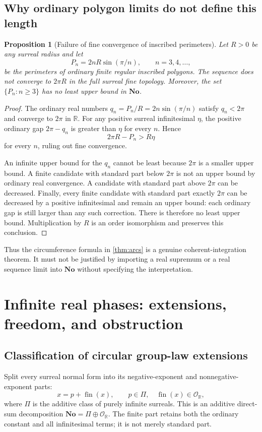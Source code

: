 \documentclass[11pt]{article}
\numberwithin{equation}{section}
\newtheorem{proposition}[theorem]{Proposition}
\theoremstyle{definition}
\newcommand{\No}{\mathbf{No}}
\newcommand{\R}{\mathbb R}
\newcommand{\OO}{\mathcal O}
\newcommand{\fin}{\operatorname{fin}}
\begin{document}
\subsection{Why ordinary polygon limits do not define this length}
\begin{proposition}[Failure of fine convergence of inscribed perimeters]\label{prop:perimeters}
Let $R>0$ be any surreal radius and let
\[
 P_n=2nR\sin(\pi/n),\qquad n=3,4,\ldots,
\]
be the perimeters of ordinary finite regular inscribed polygons. The sequence does not converge to $2\pi R$ in the full surreal fine topology. Moreover, the set $\{P_n:n\ge3\}$ has no least upper bound in $\No$.
\end{proposition}
\begin{proof}
The ordinary real numbers $q_n=P_n/R=2n\sin(\pi/n)$ satisfy $q_n<2\pi$ and converge to $2\pi$ in $\R$. For any positive surreal infinitesimal $\eta$, the positive ordinary gap $2\pi-q_n$ is greater than $\eta$ for every $n$. Hence
\[
 2\pi R-P_n>R\eta
\]
for every $n$, ruling out fine convergence.

An infinite upper bound for the $q_n$ cannot be least because $2\pi$ is a smaller upper bound. A finite candidate with standard part below $2\pi$ is not an upper bound by ordinary real convergence. A candidate with standard part above $2\pi$ can be decreased. Finally, every finite candidate with standard part exactly $2\pi$ can be decreased by a positive infinitesimal and remain an upper bound: each ordinary gap is still larger than any such correction. There is therefore no least upper bound. Multiplication by $R$ is an order isomorphism and preserves this conclusion.
\end{proof}
Thus the circumference formula in \cref{thm:arcs} is a genuine coherent-integration theorem. It must not be justified by importing a real supremum or a real sequence limit into $\No$ without specifying the interpretation.

\section{Infinite real phases: extensions, freedom, and obstruction}\label{sec:global}
\subsection{Classification of circular group-law extensions}
Split every surreal normal form into its negative-exponent and nonnegative-exponent parts:
\begin{equation}\label{eq:splitinfinite}
 x=p+\fin(x),\qquad p\in\Pi,\quad\fin(x)\in\OO_{\R},
\end{equation}
where $\Pi$ is the additive class of purely infinite surreals. This is an additive direct-sum decomposition $\No=\Pi\oplus\OO_{\R}$. The finite part retains both the ordinary constant and all infinitesimal terms; it is not merely standard part.
\end{document}
